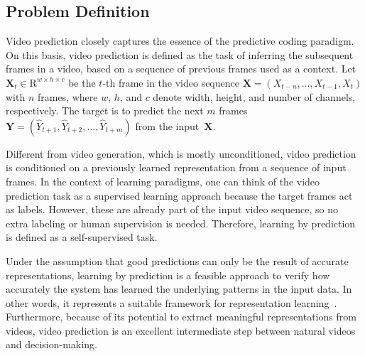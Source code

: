 
\subsection{Problem Definition}
Video prediction closely captures the essence of the predictive coding paradigm. On this basis, video prediction is defined as the task of inferring the subsequent frames in a video, based on a sequence of previous frames used as a context. Let ${\mathbf{X}_{t}\in\mathrm{R}^{w \times h \times c}}$ be the $t$-th frame in the video sequence ${\mathbf{X}=(X_{t-n},\ldots,X_{t-1},X_t)}$ with $n$ frames, where $w$, $h$, and $c$ denote width, height, and number of channels, respectively. The target is to predict the next $m$ frames ${\mathbf{Y}=(\hat{Y}_{t+1},\hat{Y}_{t+2},\ldots,\hat{Y}_{t+m})}$ from the input~$\mathbf{X}$.

Different from video generation, which is mostly unconditioned, video prediction is conditioned on a previously learned representation from a sequence of input frames. In the context of learning paradigms, one can think of the video prediction task as a supervised learning approach because the target frames act as labels. However, these are already part of the input video sequence, so no extra labeling or human supervision is needed. Therefore, learning by prediction is defined as a self-supervised task.

Under the assumption that good predictions can only be the result of accurate representations, learning by prediction is a feasible approach to verify how accurately the system has learned the underlying patterns in the input data. In other words, it represents a suitable framework for representation learning~\cite{Bengio2013,Wang2015}. Furthermore, because of its potential to extract meaningful representations from videos, video prediction is an excellent intermediate step between natural videos and decision-making.


